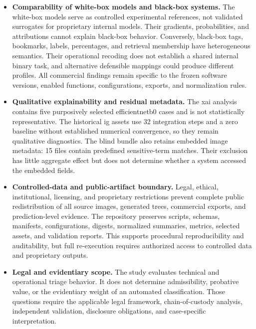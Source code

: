 \begin{itemize}
\item \textbf{Comparability of white-box models and black-box systems.}
The white-box models serve as controlled experimental references, not validated
surrogates for proprietary internal models. Their gradients, probabilities,
and attributions cannot explain black-box behavior. Conversely, black-box
tags, bookmarks, labels, percentages, and retrieval membership have
heterogeneous semantics. Their operational recoding does not establish a
shared internal binary task, and alternative defensible mappings could produce
different profiles. All commercial findings remain specific to the frozen
software versions, enabled functions, configurations, exports, and
normalization rules.

\item \textbf{Qualitative explainability and residual metadata.}
The \gls{xai} analysis contains five purposively selected
\gls{efficientnetb0} cases and is not statistically representative. The
historical \gls{ig} assets use 32 integration steps and a zero baseline without
established numerical convergence, so they remain qualitative diagnostics. The
blind bundle also retains embedded image metadata: 15 files contain predefined
sensitive-term matches. Their exclusion has little aggregate effect but does
not determine whether a system accessed the embedded fields.

\item \textbf{Controlled-data and public-artifact boundary.}
Legal, ethical, institutional, licensing, and proprietary restrictions prevent
complete public redistribution of all source images, generated trees,
commercial exports, and prediction-level evidence. The repository preserves
scripts, schemas, manifests, configurations, digests, normalized summaries,
metrics, selected assets, and validation reports. This supports procedural
reproducibility and auditability, but full re-execution requires authorized
access to controlled data and proprietary outputs.

\item \textbf{Legal and evidentiary scope.}
The study evaluates technical and operational triage behavior. It does not
determine admissibility, probative value, or the evidentiary weight of an
automated classification. Those questions require the applicable legal
framework, chain-of-custody analysis, independent validation, disclosure
obligations, and case-specific interpretation.

\end{itemize}


